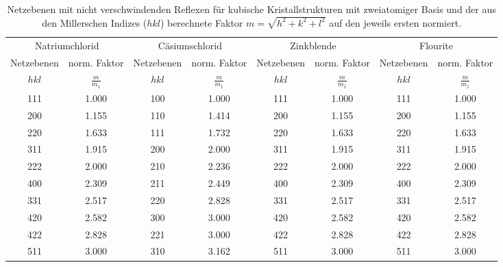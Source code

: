 \begin{table}[!h]
	\centering
	\begin{adjustbox}{width=\textwidth}
		\begin{tabular}{cccccccc}
			\toprule
			\multicolumn{2}{c}{Natriumchlorid}&\multicolumn{2}{c}{Cäsiumschlorid} & \multicolumn{2}{c}{Zinkblende}& \multicolumn{2}{c}{Flourite}\\\cmidrule(rl){1-2}\cmidrule(rl){3-4}\cmidrule(rl){5-6}\cmidrule(rl){7-8}
		Netzebenen & norm. Faktor & Netzebenen & norm. Faktor & Netzebenen & norm. Faktor & Netzebenen & norm. Faktor\\
		$hkl$ & $\frac{m}{m_1}$ & $hkl$ & $\frac{m}{m_1}$ & $hkl$ & $\frac{m}{m_1}$ & $hkl$ & $\frac{m}{m_1}$\\
\midrule
		\num{111} & \num{1.000} & \num{100} & \num{1.000} & \num{111} & \num{1.000} & \num{111} & \num{1.000}\\
		\num{200} & \num{1.155} & \num{110} & \num{1.414} & \num{200} & \num{1.155} & \num{200} & \num{1.155}\\
		\num{220} & \num{1.633} & \num{111} & \num{1.732} & \num{220} & \num{1.633} & \num{220} & \num{1.633}\\
		\num{311} & \num{1.915} & \num{200} & \num{2.000} & \num{311} & \num{1.915} & \num{311} & \num{1.915}\\
		\num{222} & \num{2.000} & \num{210} & \num{2.236} & \num{222} & \num{2.000} & \num{222} & \num{2.000}\\
		\num{400} & \num{2.309} & \num{211} & \num{2.449} & \num{400} & \num{2.309} & \num{400} & \num{2.309}\\
		\num{331} & \num{2.517} & \num{220} & \num{2.828} & \num{331} & \num{2.517} & \num{331} & \num{2.517}\\
		\num{420} & \num{2.582} & \num{300} & \num{3.000} & \num{420} & \num{2.582} & \num{420} & \num{2.582}\\
		\num{422} & \num{2.828} & \num{221} & \num{3.000} & \num{422} & \num{2.828} & \num{422} & \num{2.828}\\
		\num{511} & \num{3.000} & \num{310} & \num{3.162} & \num{511} & \num{3.000} & \num{511} & \num{3.000}\\
		\bottomrule
	\end{tabular}
	\end{adjustbox}
	\caption{Netzebenen mit nicht verschwindenden Reflexen für kubische Kristallstrukturen mit zweiatomiger Basis und der aus 
den Millerschen Indizes ($hkl$) berechnete Faktor $m = \sqrt{h^2+k^2+l^2}$ auf den jeweils ersten normiert. \label{tab:reflexe_2_atom}}
\end{table}
